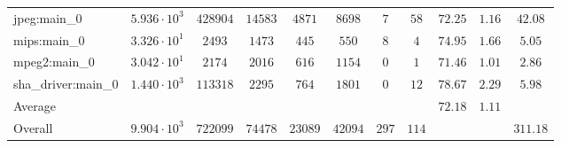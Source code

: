 \begin{tabular}{|l|c|c|c|c|c|c|c|c|c|c|}
jpeg:main\_0            & $ 5.936 \cdot 10^{3} $ & $ 428904 $ & $ 14583 $ & $ 4871  $ & $ 8698  $ & $ 7   $ & $ 58  $ & $ 72.25       $ & $ 1.16    $ & $ 42.08   $ \\
mips:main\_0            & $ 3.326 \cdot 10^{1} $ & $ 2493   $ & $ 1473  $ & $ 445   $ & $ 550   $ & $ 8   $ & $ 4   $ & $ 74.95       $ & $ 1.66    $ & $ 5.05    $ \\
mpeg2:main\_0           & $ 3.042 \cdot 10^{1} $ & $ 2174   $ & $ 2016  $ & $ 616   $ & $ 1154  $ & $ 0   $ & $ 1   $ & $ 71.46       $ & $ 1.01    $ & $ 2.86    $ \\
sha\_driver:main\_0     & $ 1.440 \cdot 10^{3} $ & $ 113318 $ & $ 2295  $ & $ 764   $ & $ 1801  $ & $ 0   $ & $ 12  $ & $ 78.67       $ & $ 2.29    $ & $ 5.98    $ \\
\hline
Average                 & $                    $ & $        $ & $       $ & $       $ & $       $ & $     $ & $     $ & $ 72.18       $ & $ 1.11    $ & $         $ \\
\hline
Overall                 & $ 9.904 \cdot 10^{3} $ & $ 722099 $ & $ 74478 $ & $ 23089 $ & $ 42094 $ & $ 297 $ & $ 114 $ & $             $ & $         $ & $ 311.18  $ \\
\hline
\end{tabular}
